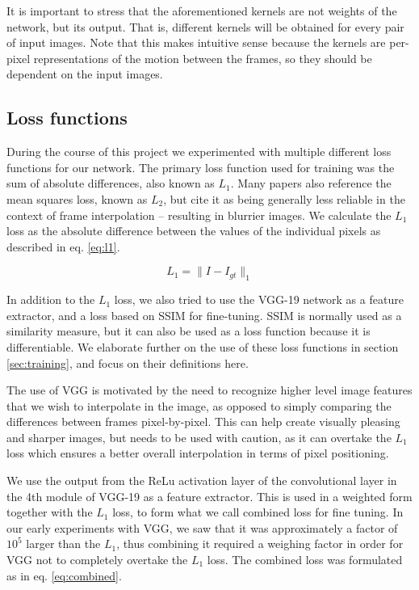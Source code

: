 \documentclass[10pt,twocolumn,letterpaper]{article}
\begin{document}
It is important to stress that the aforementioned kernels are not weights of the network, but its output. That is, different kernels will be obtained for every pair of input images. Note that this makes intuitive sense because the kernels are per-pixel representations of the motion between the frames, so they should be dependent on the input images.


\subsection{Loss functions}
During the course of this project we experimented with multiple different loss functions for our network. The primary loss function used for training was the sum of absolute differences, also known as $L_1$. Many papers also reference the mean squares loss, known as $L_2$, but cite it as being generally less reliable in the context of frame interpolation -- resulting in blurrier images. We calculate the $L_1$ loss as the absolute difference between the values of the individual pixels as described in eq. \ref{eq:l1}.

\begin{equation}
L_1= \|I - I_{gt}\|_1
\label{eq:l1}
\end{equation}

In addition to the $L_1$ loss, we also tried to use the VGG-19 \cite{VGG} network as a feature extractor, and a loss based on SSIM for fine-tuning. SSIM is normally used as a similarity measure, but it can also be used as a loss function because it is differentiable. We elaborate further on the use of these loss functions in section \ref{sec:training}, and focus on their definitions here.

The use of VGG is motivated by the need to recognize higher level image features that we wish to interpolate in the image, as opposed to simply comparing the differences between frames pixel-by-pixel. This can help create visually pleasing and sharper images, but needs to be used with caution, as it can overtake the $L_1$ loss which ensures a better overall interpolation in terms of pixel positioning.

We use the output from the ReLu activation layer of the convolutional layer in the 4th module of VGG-19 as a feature extractor. This is used in a weighted form together with the $L_1$ loss, to form what we call combined loss for fine tuning. In our early experiments with VGG, we saw that it was approximately a factor of $10^5$ larger than the $L_1$, thus combining it required a weighing factor in order for VGG not to completely overtake the $L_1$ loss. The combined loss was formulated as in eq. \ref{eq:combined}.
\end{document}
